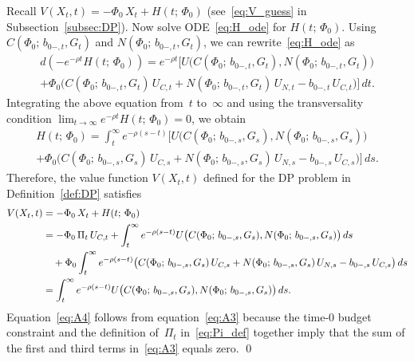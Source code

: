 \documentclass[12pt]{article}
\begin{document}
{Recall $V(X_t,t) = -\Phi_0\, X_t + H(t;\, \Phi_0)$ (see~\eqref{eq:V_guess} in Subsection~\ref{subsec:DP}). Now solve ODE~\eqref{eq:H_ode} for $H(t;\, \Phi_0)$. Using $C(\Phi_0;\, b_{0-,t}, G_t)$ and $N(\Phi_0;\, b_{0-,t}, G_t)$, we can rewrite~\eqref{eq:H_ode} as
\begin{multline*}
d(-e^{-\rho t} H(t;\, \Phi_0)) = e^{-\rho t}\biggl[U\bigl(C(\Phi_0;\, b_{0-,t}, G_t), N(\Phi_0;\, b_{0-,t}, G_t)\bigr) \\
+ \Phi_0\bigl(C(\Phi_0;\, b_{0-,t}, G_t)\, U_{C,t} + N(\Phi_0;\, b_{0-,t}, G_t)\, U_{N,t} - b_{0-,t}\, U_{C,t}\bigr)\biggr]\, dt.
\end{multline*}
Integrating the above equation from~$t$ to~$\infty$ and using the transversality condition $\lim_{t \to \infty} e^{-\rho t} H(t;\, \Phi_0) = 0$, we obtain
\begin{multline*}
H(t;\, \Phi_0) = \int_t^\infty e^{-\rho(s-t)}\biggl[U\bigl(C(\Phi_0;\, b_{0-,s}, G_s), N(\Phi_0;\, b_{0-,s}, G_s)\bigr) \\
+ \Phi_0\bigl(C(\Phi_0;\, b_{0-,s}, G_s)\, U_{C,s} + N(\Phi_0;\, b_{0-,s}, G_s)\, U_{N,s} - b_{0-,s}\, U_{C,s}\bigr)\biggr]\, ds.
\end{multline*}
Therefore, the value function $V(X_t,t)$ defined for the DP problem in Definition~\ref{def:DP} satisfies
\begin{align}
V(X_t,t) &= -\Phi_0\, X_t + H(t;\, \Phi_0) \notag\\
&= -\Phi_0\, \Pi_t\, U_{C,t} + \int_t^\infty e^{-\rho(s-t)} U\bigl(C(\Phi_0;\, b_{0-,s}, G_s), N(\Phi_0;\, b_{0-,s}, G_s)\bigr)\, ds \label{eq:A3}\\
&\quad + \Phi_0 \int_t^\infty e^{-\rho(s-t)}\bigl(C(\Phi_0;\, b_{0-,s}, G_s)\, U_{C,s} + N(\Phi_0;\, b_{0-,s}, G_s)\, U_{N,s} - b_{0-,s}\, U_{C,s}\bigr)\, ds \notag\\
&= \int_t^\infty e^{-\rho(s-t)} U\bigl(C(\Phi_0;\, b_{0-,s}, G_s), N(\Phi_0;\, b_{0-,s}, G_s)\bigr)\, ds. \label{eq:A4}
\end{align}
Equation~\eqref{eq:A4} follows from equation~\eqref{eq:A3} because the time-0 budget constraint and the definition of~$\Pi_t$ in~\eqref{eq:Pi_def} together imply that the sum of the first and third terms in~\eqref{eq:A3} equals zero. \qed

}
\end{document}
